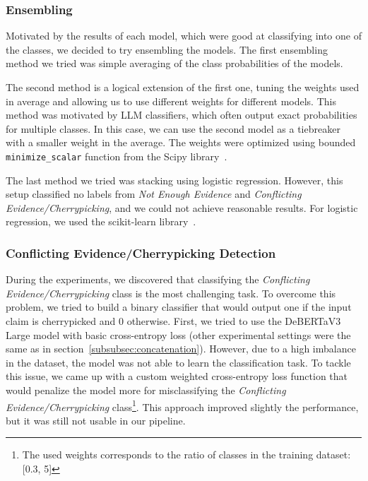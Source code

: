 \subsubsection*{Ensembling}
\label{subsubsec:ensembling}

Motivated by the results of each model, which were good at classifying into one of the classes, we decided to try ensembling the models. The first ensembling method we tried was simple averaging of the class probabilities of the models.

The second method is a logical extension of the first one, tuning the weights used in average and allowing us to use different weights for different models. This method was motivated by LLM classifiers, which often output exact probabilities for multiple classes. In this case, we can use the second model as a tiebreaker with a smaller weight in the average. The weights were optimized using bounded \texttt{minimize\_scalar} function from the Scipy library~\cite{2020SciPy-NMeth}.

The last method we tried was stacking using logistic regression. However, this setup classified no labels from \textit{Not Enough Evidence} and \textit{Conflicting Evidence/Cherrypicking}, and we could not achieve reasonable results. For logistic regression, we used the scikit-learn library~\cite{scikit-learn}.

\subsubsection*{Conflicting Evidence/Cherrypicking Detection}

During the experiments, we discovered that classifying the \textit{Conflicting Evidence/Cherrypicking} class is the most challenging task. To overcome this problem, we tried to build a binary classifier that would output one if the input claim is cherrypicked and 0 otherwise. First, we tried to use the DeBERTaV3 Large model with basic cross-entropy loss (other experimental settings were the same as in section~\ref{subsubsec:concatenation}). However, due to a high imbalance in the dataset, the model was not able to learn the classification task. To tackle this issue, we came up with a custom weighted cross-entropy loss function that would penalize the model more for misclassifying the \textit{Conflicting Evidence/Cherrypicking} class\footnote{The used weights corresponds to the ratio of classes in the training dataset: [0.3, 5]}. This approach improved slightly the performance, but it was still not usable in our pipeline.

